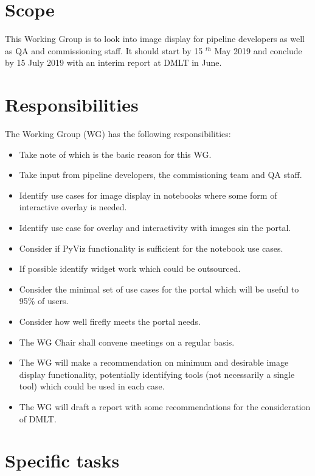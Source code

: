 \section{Scope}

This Working Group is to look into image display for pipeline developers as well as \gls{QA} and commissioning staff.
It should start by 15 $^{th}$ May  2019 and conclude by 15 July 2019 with an interim report at \gls{DMLT} in June.


\section{Responsibilities}

The Working Group (\gls{WG}) has the following responsibilities:

\begin{itemize}
 \item Take note of  which is the basic reason for this \gls{WG}.
 \item Take input from pipeline developers, the commissioning team and \gls{QA} staff.
 \item Identify use cases for image display in notebooks where some form of interactive overlay is needed.
 \item Identify use case for overlay and interactivity with images sin the portal.
 \item Consider if PyViz functionality is sufficient for the notebook use cases.
 \item If possible identify widget work which could be outsourced.
 \item Consider the minimal set of use cases for the portal which will be useful to 95\% of users.
 \item Consider how well firefly meets the portal needs.
 \item The \gls{WG} Chair shall convene meetings on a regular basis.
 \item The \gls{WG} will make a recommendation on minimum and desirable image display functionality, potentially identifying tools (not necessarily a single tool) which could be used in each case.
 \item The \gls{WG} will draft a report with some recommendations for the consideration of \gls{DMLT}.
\end{itemize}


\section{Specific tasks}

